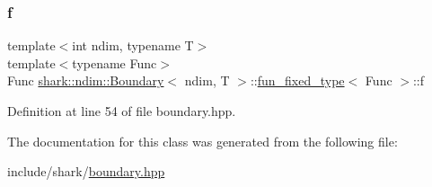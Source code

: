 \subsubsection{\texorpdfstring{f}{f}}
{\footnotesize\ttfamily template$<$int ndim, typename T$>$ \\
template$<$typename Func$>$ \\
Func \hyperlink{classshark_1_1ndim_1_1_boundary}{shark\+::ndim\+::\+Boundary}$<$ ndim, T $>$\+::\hyperlink{classshark_1_1ndim_1_1_boundary_1_1fun__fixed__type}{fun\+\_\+fixed\+\_\+type}$<$ Func $>$\+::f\hspace{0.3cm}{\ttfamily [private]}}



Definition at line 54 of file boundary.\+hpp.



The documentation for this class was generated from the following file\+:\begin{DoxyCompactItemize}
\item 
include/shark/\hyperlink{boundary_8hpp}{boundary.\+hpp}\end{DoxyCompactItemize}
